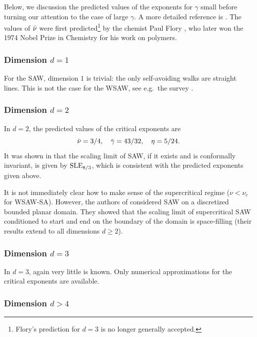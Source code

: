 Below, we discussion the predicted values of the exponents for $\gamma$ small before
turning our attention to the case of large $\gamma$. A more detailed reference is
\cite{MS93}. The values of $\bar\nu$ were first predicted\footnote{Flory's prediction
for $d = 3$ is no longer generally accepted.} by the chemist Paul Flory \cite{Flor49}, who
later won the 1974 Nobel Prize in Chemistry for his work on polymers.

\subsubsection{Dimension $d = 1$}

For the SAW, dimension $1$ is trivial: the only self-avoiding walks are straight
lines. This is not the case for the WSAW, see e.g.\ the survey \cite{HK01}.

\subsubsection{Dimension $d = 2$}

In $d = 2$, the predicted values of the critical exponents are
\begin{equation}
\bar\nu = 3/4, \quad \bar\gamma = 43/32, \quad \eta = 5/24.
\end{equation}
It was shown in \cite{LSW04} that the scaling limit of SAW, if it exists and
is conformally invariant, is given by ${\rm SLE}_{8/3}$, which is consistent with
the predicted exponents given above.

It is not immediately clear how to make sense of the supercritical regime
($\nu < \nu_c$ for WSAW-SA).
However, the authors of \cite{LSW04} considered SAW on a discretized bounded
planar domain. They showed that the scaling limit of supercritical
SAW conditioned to start and end on the boundary of the domain is space-filling
(their results extend to all dimensions $d \ge 2$).

\subsubsection{Dimension $d = 3$}

In $d = 3$, again very little is known. Only numerical approximations for
the critical exponents are available.

\subsubsection{Dimension $d > 4$}

